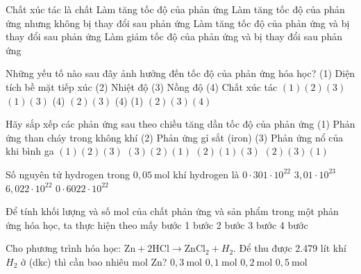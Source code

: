 \begin{ex}
	Chất xúc tác là chất
	\choice
	{Làm tăng tốc độ của phản ứng}
	{Làm tăng tốc độ của phản ứng nhưng không bị thay đổi sau phản ứng}
	{Làm tăng tốc độ của phản ứng và bị thay đổi sau phản ứng}
	{Làm giảm tốc độ của phản ứng và bị thay đổi sau phản ứng}
	\loigiai{}
\end{ex}

\begin{ex}
	Những yếu tố nào sau đây ảnh hưởng đến tốc độ của phản ứng hóa học? (1) Diện tích bề mặt tiếp xúc (2) Nhiệt độ (3) Nồng độ (4) Chất xúc tác
	\choice
	{$(1)(2)(3)$}
	{$(1)(3)$ (4)}
	{$(2)(3)$ (4)}
	{(1) $(2)(3)(4)$}
	\loigiai{}
\end{ex}

\begin{ex}
	Hãy sắp xếp các phản ứng sau theo chiều tăng dần tốc độ của phản ứng
	(1) Phản ứng than cháy trong không khí
	(2) Phản ứng gỉ sắt (iron)
	(3) Phản ứng nổ của khi bình ga
	\choice
	{$(1)(2)(3)$}
	{$(3)(2)(1)$}
	{$(2)(1)(3)$}
	{$(2)(3)(1)$}
	\loigiai{}
\end{ex}

\begin{ex}
	Số nguyên tử hydrogen trong $0,05\mathrm{~mol}$ khí hydrogen là
	\choice
	{$0\cdot 301\cdot 10^{22}$}
	{$3,01\cdot 10^{23}$}
	{$6,022\cdot 10^{22}$}
	{$0\cdot 6022\cdot 10^{22}$} 
	\loigiai{}
\end{ex}

\begin{ex}
	Để tính khối lượng và số mol của chất phản ứng và sản phẩm trong một phản ứng hóa học, ta thực hiện theo mấy bước
	\choice
	{1 bước}
	{2 bước}
	{3 bước}
	{4 bước}
	\loigiai{}
\end{ex}

\begin{ex}
	Cho phương trình hóa học: $\mathrm{Zn}+2\mathrm{HCl} \to \mathrm{ZnCl}_2+H_2$. Để thu được 2.479 lít khí $H_2$ ở (dkc) thì cần bao nhiêu mol Zn?
	\choice
	{$0,3\mathrm{~mol}$}
	{$0,1\mathrm{~mol}$}
	{$0,2\mathrm{~mol}$}
	{$0,5\mathrm{~mol}$}
	\loigiai{}
\end{ex}

